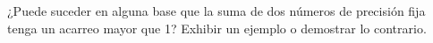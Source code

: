 \begin{enunciado}{\ejercicio}
  ¿Puede suceder en alguna base que la suma de dos números de precisión fija
  tenga un acarreo mayor que 1?
        Exhibir un ejemplo o demostrar lo contrario.
\end{enunciado}
